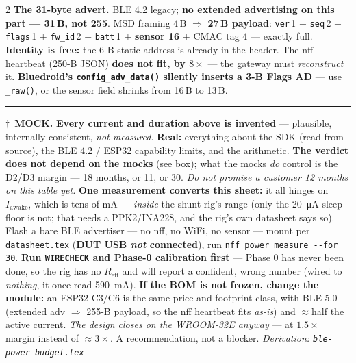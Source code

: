 \documentclass[9pt,a4paper]{extarticle}
\newcommand{\bad}[1]{\textcolor{warn}{\textbf{#1}}}
\newcommand{\mock}{\textcolor{warn}{$\dagger$}}
\begin{document}
\begin{multicols}{2}
{\vspace{0.6mm}
\textbf{The 31-byte advert.} BLE 4.2 legacy; \bad{no extended advertising on this part --- 31\,B,
not 255}. MSD framing 4\,B $\Rightarrow$ \textbf{27\,B payload}: \texttt{ver}\,1 $+$ \texttt{seq}\,2
$+$ \texttt{flags}\,1 $+$ \texttt{fw\_id}\,2 $+$ \texttt{batt}\,1 $+$ \textbf{sensor 16} $+$ CMAC
tag 4 --- exactly full. \textbf{Identity is free:} the 6-B static address is already in the header.
The nff heartbeat (250-B JSON) \bad{does not fit, by $8\times$} --- the gateway must
\emph{reconstruct} it. \bad{Bluedroid's \texttt{config\_adv\_data()} silently inserts a 3-B Flags
AD} --- use \texttt{\_raw()}, or the sensor field shrinks from 16\,B to 13\,B.
}

\end{multicols}

\vspace{-2mm}
\rule{\textwidth}{0.4pt}

{\scriptsize
\mock\ \bad{MOCK.} \textbf{Every current and duration above is invented} --- plausible, internally
consistent, \emph{not measured}. \textbf{Real:} everything about the SDK (read from source), the
BLE 4.2 / ESP32 capability limits, and the arithmetic. \textbf{The verdict does not depend on the
mocks} (see box); what the mocks \emph{do} control is the D2/D3 margin --- 18 months, or 11, or 30.
\emph{Do not promise a customer 12 months on this table yet.}
\;\textbf{One measurement converts this sheet:} it all hinges on $I_\text{awake}$, which is tens of
\si{\milli\ampere} --- \emph{inside} the shunt rig's range (only the \SI{20}{\micro\ampere} sleep
floor is not; that needs a PPK2/INA228, and the rig's own datasheet says so). Flash a bare BLE
advertiser --- no nff, no WiFi, no sensor --- mount per \texttt{datasheet.tex} (\bad{DUT USB
\emph{not} connected}), run \texttt{nff power measure -{}-for 30}. \bad{Run \texttt{WIRECHECK} and
Phase-0 calibration first} --- Phase 0 has never been done, so the rig has no $R_\text{eff}$ and
will report a confident, wrong number (wired to \emph{nothing}, it once read
\SI{590}{\milli\ampere}).
\;\textbf{If the BOM is not frozen, change the module:} an ESP32-C3/C6 is the same price and
footprint class, with BLE 5.0 (extended adv $\Rightarrow$ 255-B payload, so the nff heartbeat fits
\emph{as-is}) and $\approx$half the active current. \emph{The design closes on the WROOM-32E
anyway} --- at $1.5\times$ margin instead of $\approx3\times$. A recommendation, not a blocker.
\hfill\textit{Derivation: \texttt{ble-power-budget.tex}}
}
\end{document}
